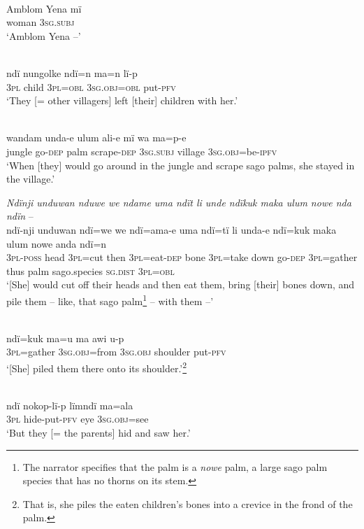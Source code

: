 \setcounter{equation}{0}
\\
\gll Amblom  Yena    mï\\
[name]    woman    3\textsc{sg.subj}\\
\glt ‘Amblom Yena --’

\\
\gll ndï  nungolke  ndï=n    ma=n      lï-p\\
3\textsc{pl}  child    3\textsc{pl=obl}  3\textsc{sg.obj=obl}  put-\textsc{pfv}\\
\glt ‘They [= other villagers] left [their] children with her.’

\\
\gll wandam  unda-e  ulum  ali-e    mï      wa    ma=p-e\\
jungle    go-\textsc{dep}  palm  scrape-\textsc{dep}  \textsc{3sg.subj}  village  \textsc{3sg.obj}=be-\textsc{ipfv}\\
\glt ‘When [they] would go around in the jungle and scrape sago palms, she stayed in the village.’

\newpage

\ex \textit{Ndïnji unduwan nduwe we ndame uma ndït li unde ndïkuk maka ulum nowe nda ndïn} --\\
\gll ndï-nji    unduwan  ndï=we  we     ndï=ama-e    uma  ndï=tï li    unda-e  ndï=kuk    maka  ulum  nowe    anda ndï=n\\
3\textsc{pl-poss}  head    3\textsc{pl}=cut  then  3\textsc{pl}=eat-\textsc{dep}  bone  3\textsc{pl}=take down  go-\textsc{dep}  3\textsc{pl}=gather  thus  palm  sago.species  \textsc{sg.dist} \textsc{3pl=obl}\\
\glt ‘[She] would cut off their heads and then eat them, bring [their] bones down, and pile them -- like, that sago palm\footnote{The narrator specifies that the palm is a \textit{nowe} palm, a large sago palm species that has no thorns on its stem.} -- with them --’

\\
\gll ndï=kuk    ma=u      ma      awi      u-p\\
3\textsc{pl}=gather  3\textsc{sg.obj}=from  3\textsc{sg.obj}  shoulder  put-\textsc{pfv}\\
\glt ‘[She] piled them there onto its shoulder.’\footnote{That is, she piles the eaten children’s bones into a crevice in the frond of the palm.}

\\
\gll ndï  nokop-lï-p    lïmndï  ma=ala\\
3\textsc{pl}  hide-put-\textsc{pfv}  eye    3\textsc{sg.obj}=see\\
\glt ‘But they [= the parents] hid and saw her.’

